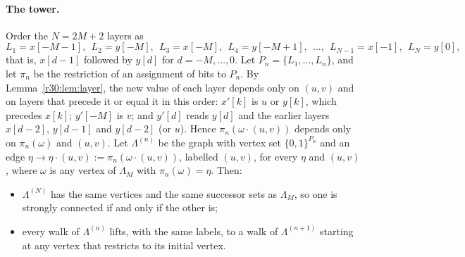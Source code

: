 \paragraph{The tower.} Order the $N=2M+2$ layers as
\[
L_1=x[-M-1],\ \ L_2=y[-M],\ \ L_3=x[-M],\ \ L_4=y[-M+1],\ \ \dots,\ \ L_{N-1}=x[-1],\ \ L_N=y[0],
\]
that is, $x[d-1]$ followed by $y[d]$ for $d=-M,\dots,0$. Let $P_n=\{L_1,\dots,L_n\}$, and let $\pi_n$ be the restriction of an assignment of bits to $P_n$. By Lemma~\ref{r30:lem:layer}, the new value of each layer depends only on $(u,v)$ and on layers that precede it or equal it in this order: $x'[k]$ is $u$ or $y[k]$, which precedes $x[k]$; $y'[-M]$ is $v$; and $y'[d]$ reads $y[d]$ and the earlier layers $x[d-2]$, $y[d-1]$ and $y[d-2]$ (or $u$). Hence $\pi_n(\omega\cdot(u,v))$ depends only on $\pi_n(\omega)$ and $(u,v)$. Let $\Lambda^{(n)}$ be the graph with vertex set $\{0,1\}^{P_n}$ and an edge $\eta\to\eta\cdot(u,v):=\pi_n(\omega\cdot(u,v))$, labelled $(u,v)$, for every $\eta$ and $(u,v)$, where $\omega$ is any vertex of $\Lambda_M$ with $\pi_n(\omega)=\eta$. Then:
\begin{itemize}
\item $\Lambda^{(N)}$ has the same vertices and the same successor sets as $\Lambda_M$, so one is strongly connected if and only if the other is;
\item every walk of $\Lambda^{(n)}$ lifts, with the same labels, to a walk of $\Lambda^{(n+1)}$ starting at any vertex that restricts to its initial vertex.
\end{itemize}

